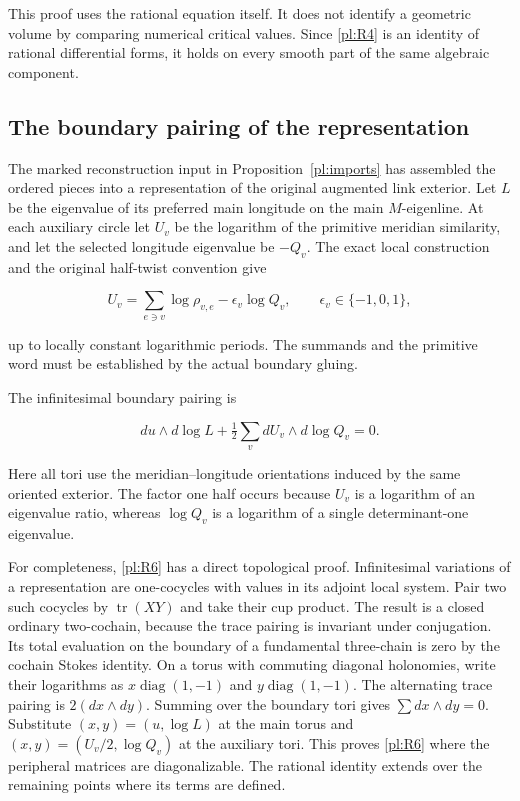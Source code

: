 This proof uses the rational equation itself. It does not identify a
geometric volume by comparing numerical critical values. Since \eqref{pl:R4} is
an identity of rational differential forms, it holds on every smooth
part of the same algebraic component.

\subsection{The boundary pairing of the representation}\label{pl:the-actual-boundary-pairing}

The marked reconstruction input in Proposition~\ref{pl:imports} has assembled the ordered pieces into a representation
of the original augmented link exterior. Let \(L\) be the
eigenvalue of its preferred main longitude on the main
\(M\)-eigenline. At each auxiliary circle let \(U_v\) be the
logarithm of the primitive meridian similarity, and let the selected
longitude eigenvalue be \(-Q_v\). The exact local construction and
the original half-twist convention give

\begin{equation}\label{pl:R5}
U_v=\sum_{e\ni v}\log\rho_{v,e}-\epsilon_v\log Q_v,
 \qquad \epsilon_v\in\{-1,0,1\},
\end{equation}

up to locally constant logarithmic periods. The summands and the
primitive word must be established by the actual boundary gluing.

The infinitesimal boundary pairing is

\begin{equation}\label{pl:R6}
du\wedge d\log L+
             \tfrac12\sum_v dU_v\wedge d\log Q_v=0.
\end{equation}

Here all tori use the meridian--longitude orientations induced by the
same oriented exterior. The factor one half occurs because \(U_v\)
is a logarithm of an eigenvalue ratio, whereas \(\log Q_v\) is
a logarithm of a single determinant-one eigenvalue.

For completeness, \eqref{pl:R6} has a direct topological proof. Infinitesimal
variations of a representation are one-cocycles with values in its
adjoint local system. Pair two such cocycles by
\(\operatorname{tr}(XY)\) and take their cup product. The result
is a closed ordinary two-cochain, because the trace pairing is
invariant under conjugation. Its total evaluation on the boundary
of a fundamental three-chain is zero by the cochain Stokes identity.
On a torus with commuting diagonal holonomies, write their logarithms
as \(x\operatorname{diag}(1,-1)\) and
\(y\operatorname{diag}(1,-1)\). The alternating trace pairing
is \(2(dx\wedge dy)\). Summing over the boundary tori gives
\(\sum dx\wedge dy=0\). Substitute
\((x,y)=(u,\log L)\) at the main torus and
\((x,y)=(U_v/2,\log Q_v)\) at the auxiliary tori. This proves
\eqref{pl:R6} where the peripheral matrices are diagonalizable. The rational
identity extends over the remaining points where its terms are defined.

